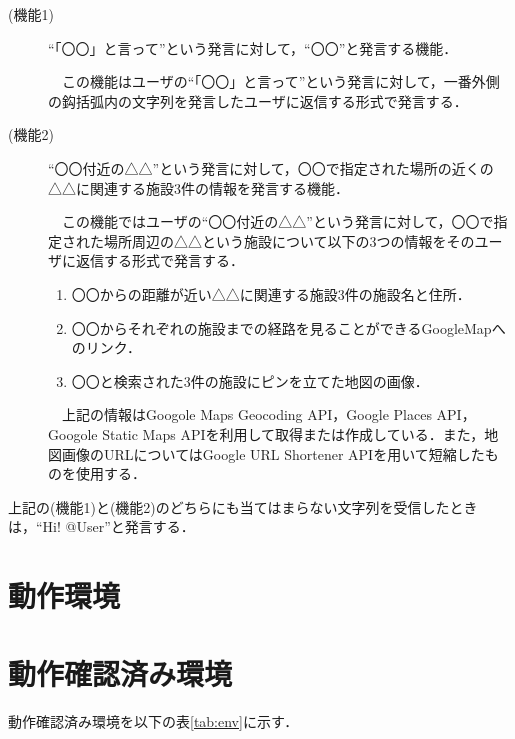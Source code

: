 \documentclass[fleqn, 14pt]{extarticlej}
\newcommand*{\tbref}[1]{表\ref{#1}}
\begin{document}
\begin{description}
\item[(機能1)]``「〇〇」と言って''という発言に対して，``〇〇''と発言する機能．
  
  　この機能はユーザの``「〇〇」と言って''という発言に対して，一番外側の鈎括弧内の文字列を発言したユーザに返信する形式で発言する．
\item[(機能2)]``〇〇付近の△△''という発言に対して，〇〇で指定された場所の近くの△△に関連する施設3件の情報を発言する機能．
  
  　この機能ではユーザの``〇〇付近の△△''という発言に対して，〇〇で指定された場所周辺の△△という施設について以下の3つの情報をそのユーザに返信する形式で発言する．

\begin{enumerate}
  \item 〇〇からの距離が近い△△に関連する施設3件の施設名と住所．
  \item 〇〇からそれぞれの施設までの経路を見ることができるGoogleMapへのリンク．
  \item 〇〇と検索された3件の施設にピンを立てた地図の画像． 
\end{enumerate}

　上記の情報はGoogole Maps Geocoding API，Google Places API，Googole Static Maps APIを利用して取得または作成している．また，地図画像のURLについてはGoogle URL Shortener APIを用いて短縮したものを使用する．

\end{description}

上記の(機能1)と(機能2)のどちらにも当てはまらない文字列を受信したときは，``Hi! @User''と発言する．

\section{動作環境}

\section{動作確認済み環境}
動作確認済み環境を以下の\tbref{tab:env}に示す．
\end{document}
